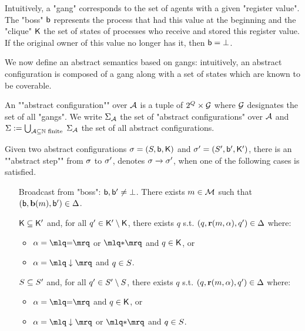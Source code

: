 Intuitively, a "gang" corresponds to the set of agents with a given "register value". The "boss" $\mathsf{b}$ represents the process that had this value at the beginning and the "clique" $\mathsf{K}$ the set of states of processes who receive and stored this register value. If the original owner of this value no longer has it, then $\mathsf{b} = \bot$.

We now define an abstract semantics based on gangs: intuitively, an abstract configuration is composed of a gang along with a set of states which are known to be coverable.

\begin{definition}
An ""abstract configuration"" over $\mathcal{A}$ is a tuple of $2^Q \times \mathcal{G}$ where $\mathcal{G}$ designates the set of all "gangs". We write $\Sigma_{\mathcal{A}}$ the set of "abstract configurations" over $\mathcal{A}$ and $\Sigma := \bigcup_{\mathcal{A} \subseteq \mathbb{N} \text{ finite }}\Sigma_{\mathcal{A}}$ the set of all abstract configurations. 

Given two abstract configurations $\sigma = (S, \mathsf{b}, \mathsf{K})$ and $\sigma' = (S', \mathsf{b}', \mathsf{K}')$, there is an ""abstract step"" from $\sigma$ to $\sigma'$, denotes $\sigma \xrightarrow{} \sigma'$, when one of the following cases is satisfied.
\begin{enumerate}
	\item[Broadcast from "boss":] $\mathsf{b}, \mathsf{b}' \ne \bot$. There exists $m \in \mathcal{M}$ such that $(\mathsf{b}, \textbf{b}(m), \mathsf{b}') \in \Delta$. 

	$\mathsf{K} \subseteq \mathsf{K}'$ and, for all $q' \in \mathsf{K}' \setminus \mathsf{K}$, there exists $q$ s.t. $(q, \textbf{r}(m, \alpha), q') \in \Delta$ where:
	\begin{itemize}
		\item $\anact = \quotemarks{\eqtestact}$ or $\quotemarks{\dummyact}$ and $q \in \mathsf{K}$, or
		\item $\anact= \quotemarks{\enregact}$ and $q \in S$.
	\end{itemize}
	
	$S \subseteq S'$ and, for all $q' \in S' \setminus S$, there exists $q$ s.t. $(q, \textbf{r}(m, \alpha), q') \in \Delta$ where:
	\begin{itemize}
		\item  $\anact = \quotemarks{\eqtestact}$ and $q \in \mathsf{K}$, or
		\item $\anact = \quotemarks{\enregact}$ or $\quotemarks{\dummyact}$ and $q \in S$.
	\end{itemize}


\end{enumerate}
\end{definition}
